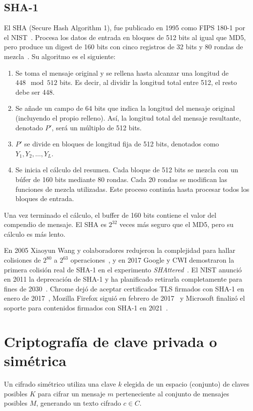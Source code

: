 \subsection{SHA-1}
El SHA (Secure Hash Algorithm 1), fue publicado en 1995 como FIPS 180-1 por el NIST~\citep{FIPS1801}. Procesa los datos de entrada en bloques de 512 bits al igual que MD5, pero produce un digest de 160 bits con cinco registros de 32 bits y 80 rondas de mezcla~\citep{FIPS1801}. Su algoritmo es el siguiente:
\begin{enumerate}
    \item Se toma el mensaje original y se rellena hasta alcanzar una longitud de $448 \mod 512$ bits. Es decir, al dividir la longitud total entre 512, el resto debe ser 448.
    \item Se añade un campo de 64 bits que indica la longitud del mensaje original (incluyendo el propio relleno). Así, la longitud total del mensaje resultante, denotado $P'$, será un múltiplo de 512 bits.
    \item $P'$ se divide en bloques de longitud fija de 512 bits, denotados como $Y_1, Y_2, \ldots, Y_L$.
    \item Se inicia el cálculo del resumen. Cada bloque de 512 bits se mezcla con un búfer de 160 bits mediante 80 rondas. Cada 20 rondas se modifican las funciones de mezcla utilizadas. Este proceso continúa hasta procesar todos los bloques de entrada.
\end{enumerate}

Una vez terminado el cálculo, el buffer de 160 bits contiene el valor del compendio de mensaje. El SHA es $2^{32}$ veces más seguro que el MD5, pero su cálculo es más lento.

En 2005 Xiaoyun Wang y colaboradores redujeron la complejidad para hallar colisiones de \(2^{80}\) a \(2^{63}\) operaciones~\citep{Wang05_SHA1}, y en 2017 Google y CWI demostraron la primera colisión real de SHA-1 en el experimento \emph{SHAttered}~\citep{GoogleShattered}. El NIST anunció en 2011 la deprecación de SHA-1 y ha planificado retirarla completamente para fines de 2030~\citep{NIST_SP800131A}. Chrome dejó de aceptar certificados TLS firmados con SHA-1 en enero de 2017~\citep{ChromeDeprecateSHA1}, Mozilla Firefox siguió en febrero de 2017~\citep{MozillaDeprecateSHA1} y Microsoft finalizó el soporte para contenidos firmados con SHA-1 en 2021~\citep{MicrosoftSHA1Deprecation}.

\section{Criptografía de clave privada o simétrica}
Un cifrado simétrico utiliza una clave $k$ elegida de un espacio (conjunto) de claves posibles $K$ para cifrar un mensaje $m$ perteneciente al conjunto de mensajes posibles $M$, generando un texto cifrado $c \in C$.


